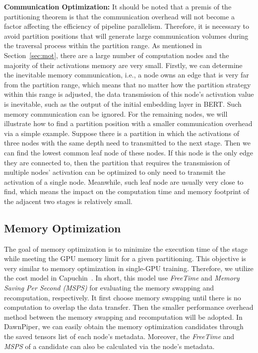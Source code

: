 \textbf{Communication Optimization:} It should be noted that a premis
of the partitioning theorem is that the communication overhead
will not become a factor affecting the efficiency of pipeline parallelism.
Therefore, it is necessary to avoid partition positions
that will generate large communication volumes
during the traversal process within the partition range.
As mentioned in Section~\ref{sec:mot}, there are a large number of computation nodes 
and the majority of their activations memory are very small.
Firstly, we can determine the inevitable memory communication,
i.e., a node owns an edge that is very far from the partition range,
which means that no matter how the partition strategy within this range is adjusted,
the data transmission of this node's activation value is inevitable,
such as the output of the initial embedding layer in BERT.
Such memory communication can be ignored.
For the remaining nodes, we will illustrate how to find a partition position
with a smaller communication overhead via a simple example.
Suppose there is a partition in which the activations of three nodes with the same depth
need to transmitted to the next stage.
Then we can find the lowest common leaf node of these nodes.
If this node is the only edge they are connected to,
then the partition that requires the transmission of multiple nodes' activation
can be optimized to only need to transmit the activation of a single node.
Meanwhile, such leaf node are usually very close to find,
which means the impact on the computation time and memory footprint
of the adjacent two stages is relatively small.

\subsection{Memory Optimization}
The goal of memory optimization is to minimize the execution time
of the stage while meeting the GPU memory limit for a given partitioning.
This objective is very similar to memory optimization in single-GPU training.
Therefore, we utilize the cost model in Capuchin~\cite{pengCapuchinTensorbasedGPU2020}.
In short, this model use \emph{FreeTime} and \emph{Memory Saving Per Second (MSPS)}
for evaluating the memory swapping and recomputation, respectively.
It first choose memory swapping until there is no computation
to overlap the data transfer.
Then the smaller performance overhead method between the memory swapping
and recomputation will be adopted.
In DawnPiper, we can easily obtain the memory optimization candidates through
the saved tensors list of each node's metadata.
Moreover, the \emph{FreeTime} and \emph{MSPS} of a candidate
can also be calculated via the node's metadata.

